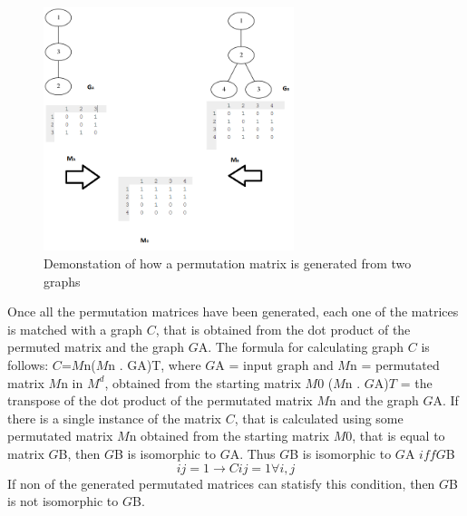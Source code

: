\begin{figure}[H]
  \begin{center}
      \includegraphics[width=0.65\textwidth]{stratMatrix}
  \end{center}    
  \caption{Demonstation of how a permutation matrix is generated from two graphs} 
  \label{fig:permutationmatrix}
\end{figure} 
Once all the permutation matrices have been generated, each one of the matrices is matched with a graph $C$, that is obtained from the dot product of the permuted matrix and the graph $G${\tiny A}.
The formula for calculating graph $C$ is follows:
$C$=$M${\tiny n}($M${\tiny n} . G{\tiny A})T, where $G${\tiny A} = input graph and  $M${\tiny n} = permutated matrix $M${\tiny n} in $M^d$, obtained from the starting matrix $M0$ ($M${\tiny n} . $G${\tiny A})$T$ = the transpose of the dot product of the permutated matrix $M${\tiny n} and the graph $G${\tiny A}.
If there is a single instance of the matrix $C$, that is calculated using some permutated matrix $M${\tiny n} obtained from the starting matrix $M0$, that is equal to matrix $G${\tiny B}, then $G${\tiny B} is isomorphic to $G${\tiny A}. Thus $G${\tiny B} is isomorphic to $G${\tiny A} $iff G${\tiny B}
  \begin{equation}	
	ij = 1 \rightarrow  Cij = 1 \forall i,j
  \end{equation} 
If non of the generated permutated matrices can statisfy this condition, then $G${\tiny B} is not isomorphic to $G${\tiny B}.

